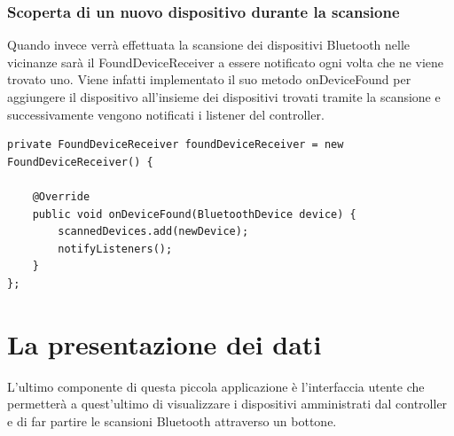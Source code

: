 \subsubsection{Scoperta di un nuovo dispositivo durante la scansione}
Quando invece verrà effettuata la scansione dei dispositivi Bluetooth nelle vicinanze sarà il FoundDeviceReceiver a essere notificato ogni volta che ne viene trovato uno. Viene infatti implementato il suo metodo onDeviceFound per aggiungere il dispositivo all'insieme dei dispositivi trovati tramite la scansione e successivamente vengono notificati i listener del controller.
\begin{verbatim}
private FoundDeviceReceiver foundDeviceReceiver = new FoundDeviceReceiver() {

    @Override
    public void onDeviceFound(BluetoothDevice device) {
        scannedDevices.add(newDevice);
        notifyListeners();
    }
};
\end{verbatim}

\section{La presentazione dei dati}
L'ultimo componente di questa piccola applicazione è l'interfaccia utente che permetterà a quest'ultimo di visualizzare i dispositivi amministrati dal controller e di far partire le scansioni Bluetooth attraverso un bottone.

